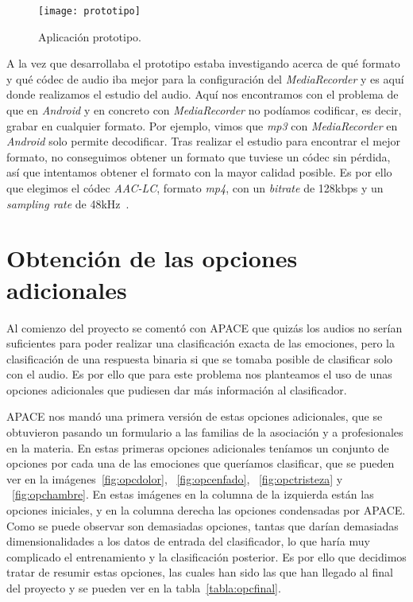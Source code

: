 \begin{figure}
	\centering
	\texttt{[image: prototipo]}
	\caption{Aplicación prototipo.}
	\label{fig:prototipo}
\end{figure}

A la vez que desarrollaba el prototipo estaba investigando acerca de qué formato y qué códec de audio iba mejor para la configuración del \textit{MediaRecorder} y es aquí donde realizamos el estudio del audio. Aquí nos encontramos con el problema de que en \textit{Android} y en concreto con \textit{MediaRecorder} no podíamos codificar, es decir, grabar en cualquier formato. Por ejemplo, vimos que \textit{mp3} con \textit{MediaRecorder} en \textit{Android} solo permite decodificar. Tras realizar el estudio para encontrar el mejor formato, no conseguimos obtener un formato que tuviese un códec sin pérdida, así que intentamos obtener el formato con la mayor calidad posible. Es por ello que elegimos el códec \textit{AAC-LC}, formato \textit{mp4}, con un \textit{bitrate} de 128kbps y un \textit{sampling rate} de 48kHz~\cite{mediarecorder}.

\section{Obtención de las opciones adicionales}
Al comienzo del proyecto se comentó con APACE que quizás los audios no serían suficientes para poder realizar una clasificación exacta de las emociones, pero la clasificación de una respuesta binaria si que se tomaba posible de clasificar solo con el audio. Es por ello que para este problema nos planteamos el uso de unas opciones adicionales que pudiesen dar más información al clasificador.

APACE nos mandó una primera versión de estas opciones adicionales, que se obtuvieron pasando un formulario a las familias de la asociación y a profesionales en la materia. En estas primeras opciones adicionales teníamos un conjunto de opciones por cada una de las emociones que queríamos clasificar, que se pueden ver en la imágenes~\ref{fig:opcdolor}, ~\ref{fig:opcenfado}, ~\ref{fig:opctristeza} y ~\ref{fig:opchambre}. En estas imágenes en la columna de la izquierda están las opciones iniciales, y en la columna derecha las opciones condensadas por APACE. Como se puede observar son demasiadas opciones, tantas que darían demasiadas dimensionalidades a los datos de entrada del clasificador, lo que haría muy complicado el entrenamiento y la clasificación posterior. Es por ello que decidimos tratar de resumir estas opciones, las cuales han sido las que han llegado al final del proyecto y se pueden ver en la tabla~\ref{tabla:opcfinal}.


